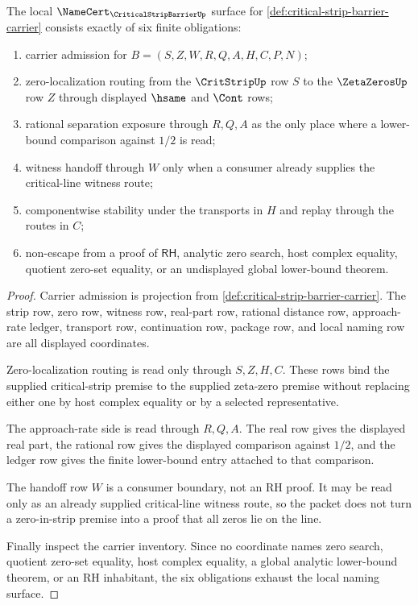 \begin{theorem}
\label{thm:critical-strip-barrier-namecert-obligations}
The local $\NameCert_{\CriticalStripBarrierUp}$ surface for \autoref{def:critical-strip-barrier-carrier} consists exactly of six finite obligations:
\begin{enumerate}
\item carrier admission for $B=(S,Z,W,R,Q,A,H,C,P,N)$;
\item zero-localization routing from the $\CritStripUp$ row $S$ to the $\ZetaZerosUp$ row $Z$ through displayed $\hsame$ and $\Cont$ rows;
\item rational separation exposure through $R,Q,A$ as the only place where a lower-bound comparison against $1/2$ is read;
\item witness handoff through $W$ only when a consumer already supplies the critical-line witness route;
\item componentwise stability under the transports in $H$ and replay through the routes in $C$;
\item non-escape from a proof of $\mathsf{RH}$, analytic zero search, host complex equality, quotient zero-set equality, or an undisplayed global lower-bound theorem.
\end{enumerate}
\end{theorem}
\begin{proof}
Carrier admission is projection from \autoref{def:critical-strip-barrier-carrier}. The strip row, zero row, witness row, real-part row, rational distance row, approach-rate ledger, transport row, continuation row, package row, and local naming row are all displayed coordinates.

Zero-localization routing is read only through $S,Z,H,C$. These rows bind the supplied critical-strip premise to the supplied zeta-zero premise without replacing either one by host complex equality or by a selected representative.

The approach-rate side is read through $R,Q,A$. The real row gives the displayed real part, the rational row gives the displayed comparison against $1/2$, and the ledger row gives the finite lower-bound entry attached to that comparison.

The handoff row $W$ is a consumer boundary, not an RH proof. It may be read only as an already supplied critical-line witness route, so the packet does not turn a zero-in-strip premise into a proof that all zeros lie on the line.

Finally inspect the carrier inventory. Since no coordinate names zero search, quotient zero-set equality, host complex equality, a global analytic lower-bound theorem, or an RH inhabitant, the six obligations exhaust the local naming surface.
\end{proof}

